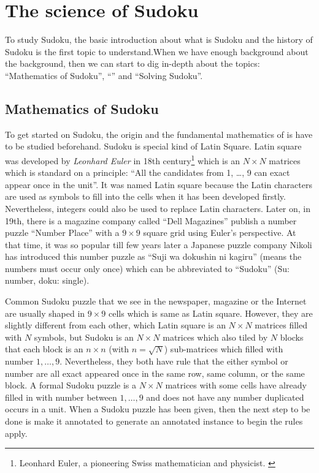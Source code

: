 \documentclass[11pt]{report}
\begin{document}
\section{The science of Sudoku}
\label{sec:introLiterature}
 
To study Sudoku, the basic introduction about what is Sudoku and the history of Sudoku is the first topic to understand.When we have enough background about the background, then we can start to dig in-depth about the topics: ``Mathematics of Sudoku'', ``'' and ``Solving Sudoku''.

\subsection{Mathematics of Sudoku}
\label{sec:background}
To get started on Sudoku, the origin and the fundamental mathematics of is have to be studied beforehand. Sudoku is special kind of Latin Square\cite{website:LatinSquare}. Latin square was developed by \textit{Leonhard Euler} in 18th century\footnote{Leonhard Euler, a pioneering Swiss mathematician and physicist. \cite{website:LeonhardEuler}} which is an $N \times N$ matrices which is standard on a principle: ``All the candidates from 1, \dots , 9 can exact appear once in the unit''. It was named Latin square because the Latin characters are used as symbols to fill into the cells\cite{Delahay2006Science} when it has been developed firstly. Nevertheless, integers could also be used to replace Latin characters. Later on, in 19th, there is a magazine company called ``Dell Magazines'' publish a number puzzle ``Number Place'' with a $9 \times 9$ square grid using Euler's perspective. At that time, it was so popular till few years later a Japanese puzzle company Nikoli has introduced this number puzzle as ``Suji wa dokushin ni kagiru'' (means the numbers must occur only once) which can be abbreviated to ``Sudoku'' (Su: number, doku: single)\cite{GarciaPalomino2007SolvingSudoku}. 

Common Sudoku puzzle that we see in the newspaper, magazine or the Internet are usually shaped in $9 \times 9$ cells which is same as Latin square. However, they are slightly different from each other, which Latin square is an $N \times N$ matrices filled with $N$ symbols, but Sudoku is an  $N \times N$ matrices which also tiled by $N$ blocks that each block is an $n \times n$ (with $n = \sqrt{N}$) sub-matrices which filled with number $1,\dots ,9$. Nevertheless, they both have rule that the either symbol or number are all exact appeared once in the same row, same column, or the same block. A formal Sudoku puzzle is a $N \times N$ matrices with some cells have already filled in with number between $1,\dots ,9$ and does not have any number duplicated occurs in a unit. When a Sudoku puzzle has been given, then the next step to be done is make it annotated to generate an annotated instance to begin the rules apply.
\end{document}
